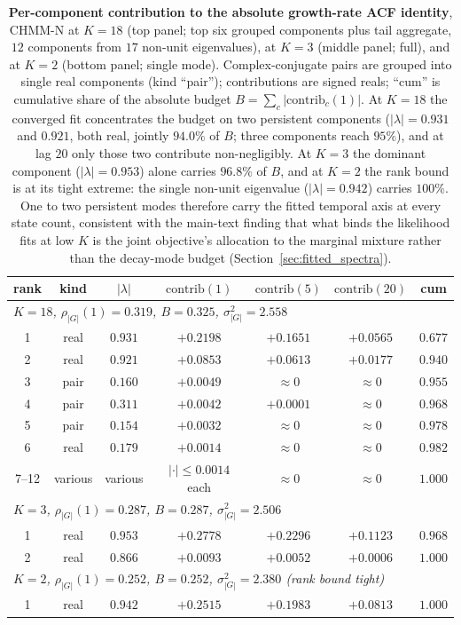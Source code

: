 \begin{table}[!ht]
\centering
\small
\caption{\textbf{Per-component contribution to the absolute growth-rate ACF identity}, CHMM-N at $K = 18$ (top panel; top six grouped components plus tail aggregate, $12$ components from $17$ non-unit eigenvalues), at $K = 3$ (middle panel; full), and at $K = 2$ (bottom panel; single mode). Complex-conjugate pairs are grouped into single real components (kind ``pair''); contributions are signed reals; ``cum'' is cumulative share of the absolute budget $B = \sum_c |\mathrm{contrib}_c(1)|$. At $K = 18$ the converged fit concentrates the budget on two persistent components ($|\lambda| = 0.931$ and $0.921$, both real, jointly $94.0\%$ of $B$; three components reach $95\%$), and at lag $20$ only those two contribute non-negligibly. At $K = 3$ the dominant component ($|\lambda| = 0.953$) alone carries $96.8\%$ of $B$, and at $K = 2$ the rank bound is at its tight extreme: the single non-unit eigenvalue ($|\lambda| = 0.942$) carries $100\%$. One to two persistent modes therefore carry the fitted temporal axis at every state count, consistent with the main-text finding that what binds the likelihood fits at low $K$ is the joint objective's allocation to the marginal mixture rather than the decay-mode budget (Section~\ref{sec:fitted_spectra}).}
\label{tab:spectral_rank}
\begin{tabular}{c c c c c c c}
\toprule
rank & kind & $|\lambda|$ & $\mathrm{contrib}(1)$ & $\mathrm{contrib}(5)$ & $\mathrm{contrib}(20)$ & cum \\
\midrule
\multicolumn{7}{l}{\textit{$K = 18$, $\rho_{|G|}(1) = 0.319$, $B = 0.325$, $\sigma^2_{|G|} = 2.558$}} \\
\midrule
1   & real & $0.931$ & $+0.2198$ & $+0.1651$  & $+0.0565$  & $0.677$ \\
2   & real & $0.921$ & $+0.0853$ & $+0.0613$  & $+0.0177$  & $0.940$ \\
3   & pair & $0.160$ & $+0.0049$ & $\approx 0$ & $\approx 0$ & $0.955$ \\
4   & pair & $0.311$ & $+0.0042$ & $+0.0001$  & $\approx 0$ & $0.968$ \\
5   & pair & $0.154$ & $+0.0032$ & $\approx 0$ & $\approx 0$ & $0.978$ \\
6   & real & $0.179$ & $+0.0014$ & $\approx 0$ & $\approx 0$ & $0.982$ \\
7--12 & various & various & $|{\cdot}| \le 0.0014$ each & $\approx 0$ & $\approx 0$ & $1.000$ \\
\midrule
\multicolumn{7}{l}{\textit{$K = 3$, $\rho_{|G|}(1) = 0.287$, $B = 0.287$, $\sigma^2_{|G|} = 2.506$}} \\
\midrule
1 & real & $0.953$ & $+0.2778$ & $+0.2296$ & $+0.1123$ & $0.968$ \\
2 & real & $0.866$ & $+0.0093$ & $+0.0052$ & $+0.0006$ & $1.000$ \\
\midrule
\multicolumn{7}{l}{\textit{$K = 2$, $\rho_{|G|}(1) = 0.252$, $B = 0.252$, $\sigma^2_{|G|} = 2.380$ (rank bound tight)}} \\
\midrule
1 & real & $0.942$ & $+0.2515$ & $+0.1983$ & $+0.0813$ & $1.000$ \\
\bottomrule
\end{tabular}
\end{table}


